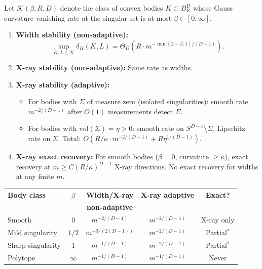 \begin{theorem}
\label{thm:problem15}
Let $\mathcal{K}(\beta, R, D)$ denote the class of convex bodies $K \subset B_R^D$ whose Gauss curvature vanishing rate at the singular set is at most $\beta \in [0, \infty]$.

\begin{enumerate}[label=(\alph*)]
  \item \textbf{Width stability (non-adaptive):}
  \[
    \sup_{K, L \in \mathcal{K}} \delta_H(K, L) = \Theta_D\!\left(R \cdot m^{-\min(2-\beta, 1)/(D-1)}\right).
  \]

  \item \textbf{X-ray stability (non-adaptive):} Same rate as widths.
  
  \item \textbf{X-ray stability (adaptive):}
  \begin{itemize}
    \item For bodies with $\Sigma$ of measure zero (isolated singularities): smooth rate $m^{-2/(D-1)}$ after $O(1)$ measurements detect $\Sigma$.
    \item For bodies with $\mathrm{vol}(\Sigma) = \eta > 0$: smooth rate on $S^{D-1} \setminus \Sigma$, Lipschitz rate on $\Sigma$. Total: $O(R/\kappa \cdot m^{-2/(D-1)} + R\eta^{1/(D-1)})$.
  \end{itemize}
  
  \item \textbf{X-ray exact recovery:} For smooth bodies ($\beta = 0$, curvature $\geq \kappa$), exact recovery at $m \geq C(R/\kappa)^{D-1}$ X-ray directions. No exact recovery for widths at any finite $m$.
\end{enumerate}
\end{theorem}

\begin{center}
\renewcommand{\arraystretch}{1.4}
\begin{tabular}{lcccc}
\toprule
\textbf{Body class} & $\beta$ & \textbf{Width/X-ray} & \textbf{X-ray adaptive} & \textbf{Exact?} \\
 & & \textbf{non-adaptive} & & \\
\midrule
Smooth & 0 & $m^{-2/(D-1)}$ & $m^{-2/(D-1)}$ & X-ray only \\
Mild singularity & $1/2$ & $m^{-3/(2(D-1))}$ & $m^{-2/(D-1)}$ & Partial$^*$ \\
Sharp singularity & 1 & $m^{-1/(D-1)}$ & $m^{-2/(D-1)}$ & Partial$^*$ \\
Polytope & $\infty$ & $m^{-1/(D-1)}$ & $m^{-1/(D-1)}$ & Never \\
\bottomrule
\end{tabular}
\end{center}

